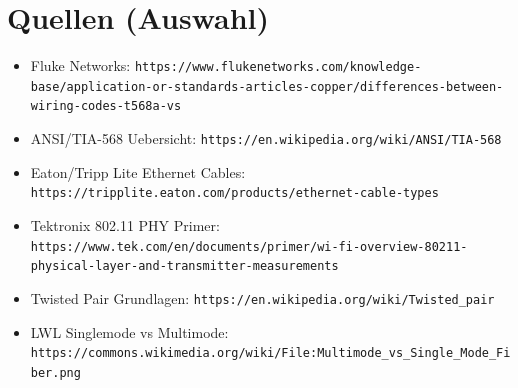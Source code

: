 \documentclass[11pt, oneside, numbers=noenddot]{scrbook}
\begin{document}
\section*{Quellen (Auswahl)}
\begin{itemize}
\item Fluke Networks: \texttt{https://www.flukenetworks.com/knowledge-base/application-or-standards-articles-copper/differences-between-wiring-codes-t568a-vs}
\item ANSI/TIA-568 Uebersicht: \texttt{https://en.wikipedia.org/wiki/ANSI/TIA-568}
\item Eaton/Tripp Lite Ethernet Cables: \texttt{https://tripplite.eaton.com/products/ethernet-cable-types}
\item Tektronix 802.11 PHY Primer: \texttt{https://www.tek.com/en/documents/primer/wi-fi-overview-80211-physical-layer-and-transmitter-measurements}
\item Twisted Pair Grundlagen: \texttt{https://en.wikipedia.org/wiki/Twisted\_pair}
\item LWL Singlemode vs Multimode: \texttt{https://commons.wikimedia.org/wiki/File:Multimode\_vs\_Single\_Mode\_Fiber.png}
\end{itemize}
\end{document}
